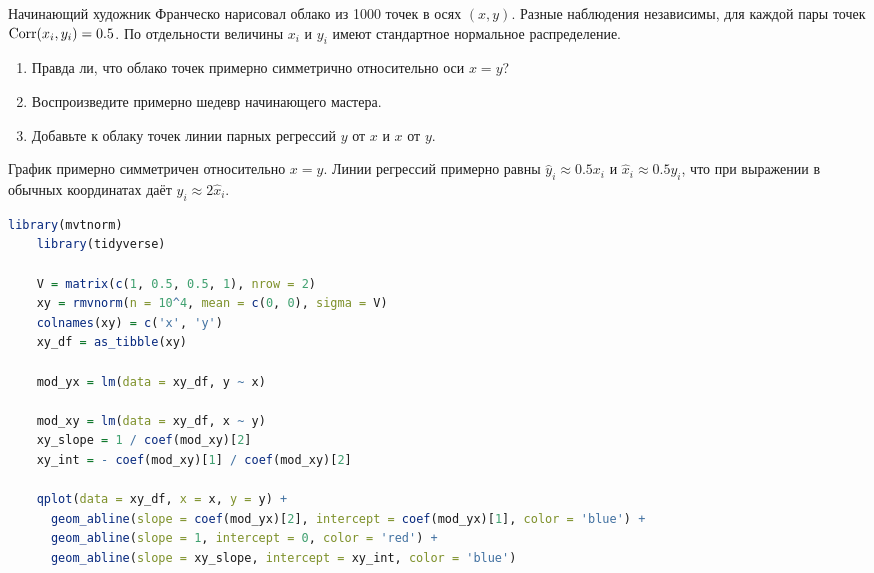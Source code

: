 \begin{problem}
  Начинающий художник Франческо нарисовал облако из 1000 точек в осях $(x, y)$.
  Разные наблюдения независимы, для каждой пары точек $\operatorname{Corr}(x_i, y_i) = 0.5$.
  По отдельности величины $x_i$ и $y_i$ имеют стандартное нормальное распределение. 

  \begin{enumerate}
    \item Правда ли, что облако точек примерно симметрично относительно оси $x=y$?
    \item Воспроизведите примерно шедевр начинающего мастера. 
    \item Добавьте к облаку точек линии парных регрессий $y$ от $x$ и $x$ от $y$. 
  \end{enumerate}


\begin{sol}
  График примерно симметричен относительно $x=y$. 
  Линии регрессий примерно равны $\hat y_i \approx 0.5 x_i$ и $\hat x_i \approx 0.5 y_i$, 
  что при выражении в обычных координатах даёт $y_i\approx 2 \hat x_i$. 

  \begin{lstlisting}[language=r]
    library(mvtnorm)
    library(tidyverse)
    
    V = matrix(c(1, 0.5, 0.5, 1), nrow = 2)
    xy = rmvnorm(n = 10^4, mean = c(0, 0), sigma = V)
    colnames(xy) = c('x', 'y')
    xy_df = as_tibble(xy)
    
    mod_yx = lm(data = xy_df, y ~ x)
    
    mod_xy = lm(data = xy_df, x ~ y)
    xy_slope = 1 / coef(mod_xy)[2]
    xy_int = - coef(mod_xy)[1] / coef(mod_xy)[2]
    
    qplot(data = xy_df, x = x, y = y) +
      geom_abline(slope = coef(mod_yx)[2], intercept = coef(mod_yx)[1], color = 'blue') +
      geom_abline(slope = 1, intercept = 0, color = 'red') +
      geom_abline(slope = xy_slope, intercept = xy_int, color = 'blue')
\end{lstlisting}




\end{sol}
\end{problem}
